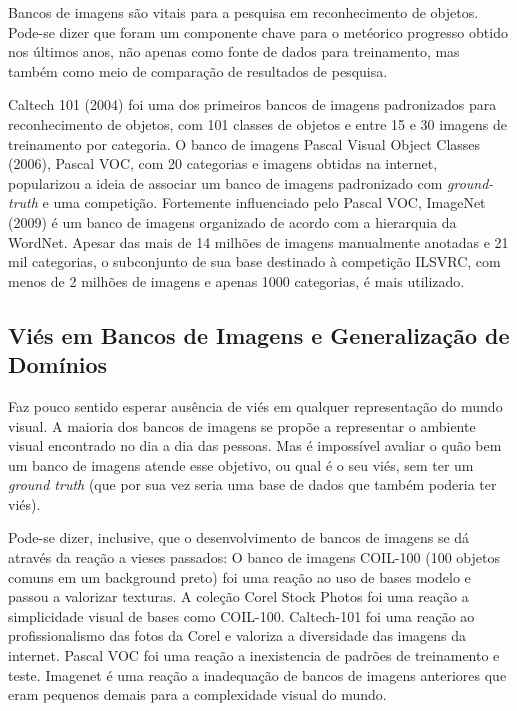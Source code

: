 \documentclass[conference]{IEEEtran}
\begin{document}
Bancos de imagens são vitais para a pesquisa em reconhecimento de objetos. Pode-se dizer que foram um componente chave para o metéorico progresso obtido nos últimos anos, não apenas como fonte de dados para treinamento, mas também como meio de comparação de resultados de pesquisa\cite{bias}. 

Caltech 101 (2004)\cite{caltech} foi uma dos primeiros bancos de imagens padronizados para reconhecimento de objetos, com 101 classes de objetos e entre 15 e 30 imagens de treinamento por categoria. O banco de imagens Pascal Visual Object Classes (2006)\cite{pascal}, Pascal VOC, com 20 categorias e imagens obtidas na internet, popularizou a ideia de associar um banco de imagens padronizado com \textit{ground-truth} e uma competição. Fortemente influenciado pelo Pascal VOC, ImageNet (2009) \cite{imagenet} é um banco de imagens organizado de acordo com a hierarquia da WordNet\cite{wordnet}. Apesar das mais de 14 milhões de imagens manualmente anotadas e 21 mil categorias, o subconjunto de sua base destinado à competição ILSVRC, com menos de 2 milhões de imagens e apenas 1000 categorias, é mais utilizado. 

\subsection{Viés em Bancos de Imagens e Generalização de Domínios}

Faz pouco sentido esperar ausência de viés em qualquer representação do mundo visual. A maioria dos bancos de imagens se propõe a representar o ambiente visual encontrado no dia a dia das pessoas. Mas é impossível avaliar o quão bem um banco de imagens atende esse objetivo, ou qual é o seu viés, sem ter um \textit{ground truth} (que por sua vez seria uma base de dados que também poderia ter viés)\cite{bias}. 

Pode-se dizer, inclusive, que o desenvolvimento de bancos de imagens se dá através da reação a vieses passados: O banco de imagens COIL-100 (100 objetos comuns em um background preto) foi uma reação ao uso de bases modelo e passou a valorizar texturas. A coleção Corel Stock Photos foi uma reação a simplicidade visual de bases como COIL-100. Caltech-101 foi uma reação ao profissionalismo das fotos da Corel e valoriza a diversidade das imagens da internet. Pascal VOC foi uma reação a inexistencia de padrões de treinamento e teste. Imagenet é uma reação a inadequação de bancos de imagens anteriores que eram pequenos demais para a complexidade visual do mundo\cite{bias}.
\end{document}
